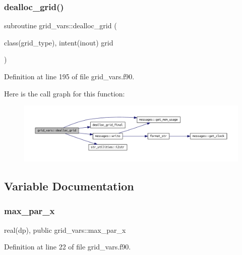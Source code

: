 \subsubsection{\texorpdfstring{dealloc\+\_\+grid()}{dealloc\_grid()}}
{\footnotesize\ttfamily subroutine grid\+\_\+vars\+::dealloc\+\_\+grid (\begin{DoxyParamCaption}\item[{class(grid\+\_\+type), intent(inout)}]{grid }\end{DoxyParamCaption})}



Definition at line 195 of file grid\+\_\+vars.\+f90.

Here is the call graph for this function\+:
\nopagebreak
\begin{figure}[H]
\begin{center}
\leavevmode
\includegraphics[width=350pt]{namespacegrid__vars_abc8ea59261a1e773754afebdb13276f9_cgraph}
\end{center}
\end{figure}


\subsection{Variable Documentation}
\mbox{\label{namespacegrid__vars_acaa1fd21d0c728ad8f24591c0d2a5801}} 
\subsubsection{\texorpdfstring{max\+\_\+par\+\_\+x}{max\_par\_x}}
{\footnotesize\ttfamily real(dp), public grid\+\_\+vars\+::max\+\_\+par\+\_\+x}



Definition at line 22 of file grid\+\_\+vars.\+f90.

\mbox{\label{namespacegrid__vars_a689c08cf03bc54338878f85c6429b856}} 
